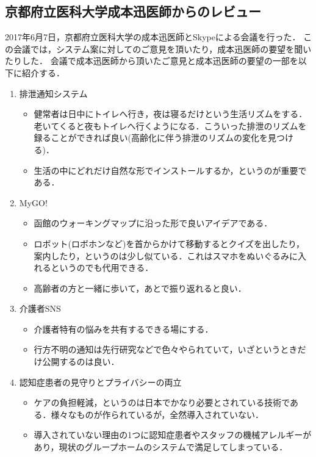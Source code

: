 \documentclass[../report]{subfiles}
\begin{document}
\subsection{京都府立医科大学成本迅医師からのレビュー}  \label{sec:4_hyouka_before3}
2017年6月7日，京都府立医科大学の成本迅医師とSkypeによる会議を行った．
この会議では，システム案に対してのご意見を頂いたり，成本迅医師の要望を聞いたりした．
会議で成本迅医師から頂いたご意見と成本迅医師の要望の一部を以下に紹介する．

\begin{enumerate}
    \item[] 排泄通知システム
\begin{itemize}
    \item 健常者は日中にトイレへ行き，夜は寝るだけという生活リズムをする．老いてくると夜もトイレへ行くようになる．こういった排泄のリズムを録ることができれば良い(高齢化に伴う排泄のリズムの変化を見つける)．
    \item 生活の中にどれだけ自然な形でインストールするか，というのが重要である．
\end{itemize}

    \item[] MyGO!
\begin{itemize}
    \item 函館のウォーキングマップに沿った形で良いアイデアである．
    \item ロボット(ロボホンなど)を首からかけて移動するとクイズを出したり，案内したり，というのは少し似ている．これはスマホをぬいぐるみに入れるというのでも代用できる．
    \item 高齢者の方と一緒に歩いて，あとで振り返れると良い．
\end{itemize}

    \item[] 介護者SNS
\begin{itemize}
    \item 介護者特有の悩みを共有するできる場にする．
    \item 行方不明の通知は先行研究などで色々やられていて，いざというときだけ公開するのは良い．
\end{itemize}

    \item[] 認知症患者の見守りとプライバシーの両立
\begin{itemize}
    \item ケアの負担軽減，というのは日本でかなり必要とされている技術である．様々なものが作られているが，全然導入されていない．
    \item 導入されていない理由の1つに認知症患者やスタッフの機械アレルギーがあり，現状のグループホームのシステムで満足してしまっている．
\end{itemize}


\end{enumerate}
\end{document}
